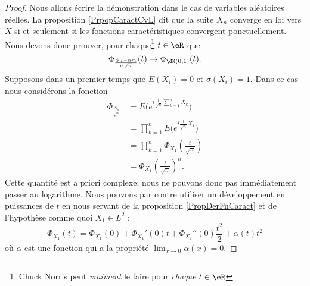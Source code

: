 \begin{proof}
    Nous allons écrire la démonstration dans le cas de variables aléatoires réelles. La proposition \ref{PrpopCaractCvL} dit que la suite \( X_n\) converge en loi vers \( X\) si et seulement si les fonctions caractéristiques convergent ponctuellement. Nous devons donc prouver, pour chaque\footnote{Chuck Norris peut \emph{vraiment} le faire pour \emph{chaque} $t\in\eR$} \( t\in\eR\) que
    \begin{equation}        \label{EqPhitophidNtznu}
        \Phi_{\frac{ S_n-nm }{ \sigma\sqrt{n} }}(t)\to\Phi_{\dN(0,1)}(t).
    \end{equation}
    Supposons dans un premier temps que \( E(X_i)=0\) et \( \sigma(X_i)=1\). Dans ce cas nous considérons la fonction 
    \begin{subequations}
        \begin{align}
            \Phi_{\frac{ S_n }{ \sqrt{n} }}&=E\big(  e^{i\frac{ t }{ \sqrt{n} }\sum_{k=1}^nX_k} \big)\\
            &=\prod_{k=1}^nE\big(  e^{i\frac{ t }{ \sqrt{n} }X_1} \big)\\
            &=\prod_{k=1}^n\Phi_{X_1}\left( \frac{ t }{ \sqrt{n} } \right)\\
            &=\Phi_{X_1}\left( \frac{ t }{ \sqrt{n} } \right)^n.
        \end{align}
    \end{subequations}
    Cette quantité est a priori complexe; nous ne pouvons donc pas immédiatement passer au logarithme. Nous pouvons par contre utiliser un développement en puissances de \( t\) en nous servant de la proposition \ref{PropDerFnCaract} et de l'hypothèse comme quoi \( X_1\in L^2\) :
    \begin{equation}
        \Phi_{X_1}(t)=\Phi_{X_1}(0)+\Phi_{X_1}'(0)t+\Phi_{X_1}''(0)\frac{ t^2 }{2}+\alpha(t)t^2
    \end{equation}
    où \( \alpha\) est une fonction qui a la propriété \( \lim_{x\to 0} \alpha(x)=0\).


\end{proof}
